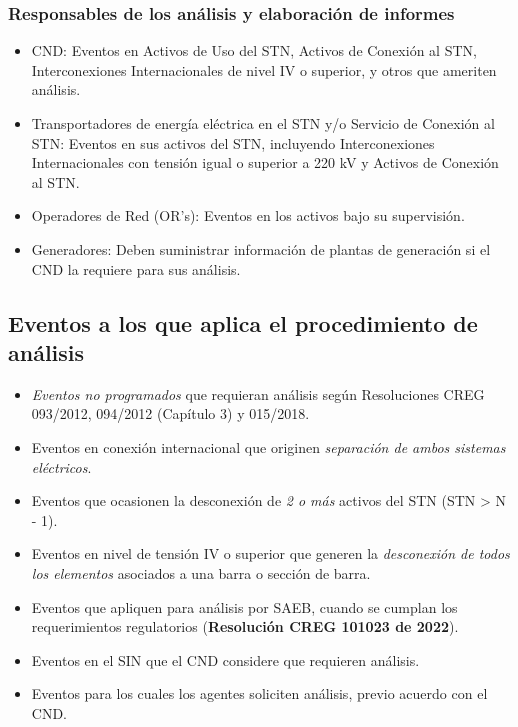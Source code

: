 \documentclass[a5paper]{book}%
\begin{document}
\subsubsection{Responsables de los análisis y elaboración de informes}

\begin{itemize}
  
\item CND: Eventos en Activos de Uso del STN, Activos de Conexión al STN, Interconexiones Internacionales de nivel IV o superior, y otros que ameriten análisis.
    
  \item Transportadores de energía eléctrica en el \ac{STN} y/o Servicio de Conexión al \ac{STN}: Eventos en sus activos del \ac{STN}, incluyendo Interconexiones Internacionales con tensión igual o superior a 220 kV y Activos de Conexión al \ac{STN}.
  
  \item Operadores de Red (OR's): Eventos en los activos bajo su supervisión.
    
  \item Generadores: Deben suministrar información de plantas de generación si el \ac{CND} la requiere para sus análisis.

\end{itemize}



\subsection{Eventos a los que aplica el procedimiento de análisis}

\begin{itemize}
\item\textit{ Eventos no programados} que requieran análisis según Resoluciones CREG 093/2012, 094/2012 (Capítulo 3) y 015/2018.
\item Eventos en conexión internacional que originen \textit{separación de ambos sistemas eléctricos}.
    
\item Eventos que ocasionen la desconexión de \textit{2 o más} activos del STN (STN > N - 1).
    
\item Eventos en nivel de tensión IV o superior que generen la \textit{desconexión de todos los elementos} asociados a una barra o sección de barra.
    
\item Eventos que apliquen para análisis por \ac{SAEB}, cuando se cumplan los requerimientos regulatorios (\textbf{Resolución CREG 101023 de 2022}).
    
\item Eventos en el SIN que el CND considere que requieren análisis.
    
\item Eventos para los cuales los agentes soliciten análisis, previo acuerdo con el CND.

\end{itemize}
    
\end{document}
